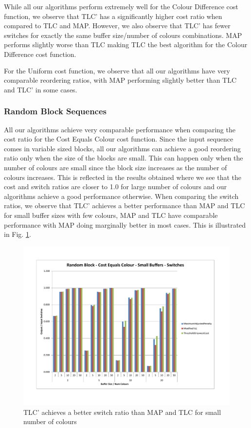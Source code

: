 While all our algorithms perform extremely well for the Colour Difference cost function, we observe that TLC' has a significantly higher cost ratio when compared to TLC and MAP. However, we also observe that TLC' has fewer switches for exactly the same buffer size/number of colours combinations. MAP performs slightly worse than TLC making TLC the best algorithm for the Colour Difference cost function. 

For the Uniform cost function, we observe that all our algorithms have very comparable reordering ratios, with MAP performing slightly better than TLC and TLC' in some cases. 

\subsubsection{Random Block Sequences}

All our algorithms achieve very comparable performance when comparing the cost ratio for the Cost Equals Colour cost function. Since the input sequence comes in variable sized blocks, all our algorithms can achieve a good reordering ratio only when the size of the blocks are small. This can happen only when the number of colours are small since the block size increases as the number of colours increases. This is reflected in the results obtained where we see that the cost and switch ratios are closer to 1.0 for large number of colours and our algorithms achieve a good performance otherwise. When comparing the switch ratios, we observe that TLC' achieves a better performance than MAP and TLC for small buffer sizes with few colours, MAP and TLC have comparable performance with MAP doing marginally better in most cases. This is illustrated in Fig. \ref{randomBlockCCSmallSwitches}.

\begin{figure}[ht]
\centering 
\includegraphics[scale=0.60]{Random-Block-cc-small-switches.pdf}
\caption{TLC' achieves a better switch ratio than MAP and TLC for small number of colours}
\label{randomBlockCCSmallSwitches}
\end{figure}   

